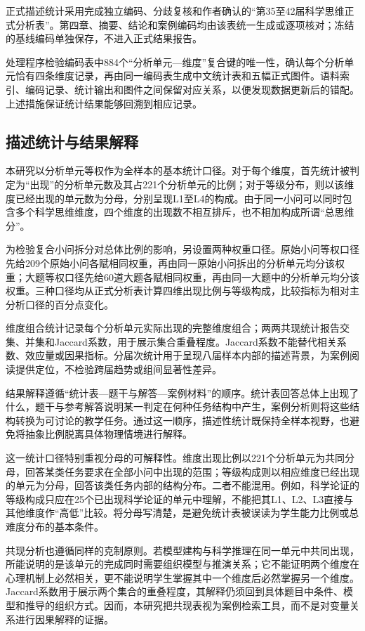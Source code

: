 \documentclass[
  12pt,
  a4paper,twoside,openany]{ctexbook}
\begin{document}
正式描述统计采用完成独立编码、分歧复核和作者确认的``第35至42届科学思维正式分析表''。第四章、摘要、结论和案例编码均由该表统一生成或逐项核对；冻结的基线编码单独保存，不进入正式结果报告。

处理程序检验编码表中884个``分析单元---维度''复合键的唯一性，确认每个分析单元恰有四条维度记录，再由同一编码表生成中文统计表和五幅正式图件。语料索引、编码记录、统计输出和图件之间保留对应关系，以便发现数据更新后的错配。上述措施保证统计结果能够回溯到相应记录。

\subsection{描述统计与结果解释}\label{ux63cfux8ff0ux7edfux8ba1ux4e0eux7ed3ux679cux89e3ux91ca}

本研究以分析单元等权作为全样本的基本统计口径。对于每个维度，首先统计被判定为``出现''的分析单元数及其占221个分析单元的比例；对于等级分布，则以该维度已经出现的单元数为分母，分别呈现L1至L4的构成。由于同一小问可以同时包含多个科学思维维度，四个维度的出现数不相互排斥，也不相加构成所谓``总思维分''。

为检验复合小问拆分对总体比例的影响，另设置两种权重口径。原始小问等权口径先给209个原始小问各赋相同权重，再由同一原始小问拆出的分析单元均分该权重；大题等权口径先给60道大题各赋相同权重，再由同一大题中的分析单元均分该权重。三种口径均从正式分析表计算四维出现比例与等级构成，比较指标为相对主分析口径的百分点变化。

维度组合统计记录每个分析单元实际出现的完整维度组合；两两共现统计报告交集、并集和Jaccard系数，用于展示集合重叠程度。Jaccard系数不能替代相关系数、效应量或因果指标。分届次统计用于呈现八届样本内部的描述背景，为案例阅读提供定位，不检验跨届趋势或组间显著性差异。

结果解释遵循``统计表---题干与解答---案例材料''的顺序。统计表回答总体上出现了什么，题干与参考解答说明某一判定在何种任务结构中产生，案例分析则将这些结构转换为可讨论的教学任务。通过这一顺序，描述性统计既保持全样本视野，也避免将抽象比例脱离具体物理情境进行解释。

这一统计口径特别重视分母的可解释性。维度出现比例以221个分析单元为共同分母，回答某类任务要求在全部小问中出现的范围；等级构成则以相应维度已经出现的单元为分母，回答该类任务内部的结构分布。二者不能混用。例如，科学论证的等级构成只应在25个已出现科学论证的单元中理解，不能把其L1、L2、L3直接与其他维度作``高低''比较。将分母写清楚，是避免统计表被误读为学生能力比例或总难度分布的基本条件。

共现分析也遵循同样的克制原则。若模型建构与科学推理在同一单元中共同出现，所能说明的是该单元的完成同时需要组织模型与推演关系；它不能证明两个维度在心理机制上必然相关，更不能说明学生掌握其中一个维度后必然掌握另一个维度。Jaccard系数用于展示两个集合的重叠程度，其解释仍须回到具体题目中条件、模型和推导的组织方式。因而，本研究把共现表视为案例检索工具，而不是对变量关系进行因果解释的证据。
\end{document}
